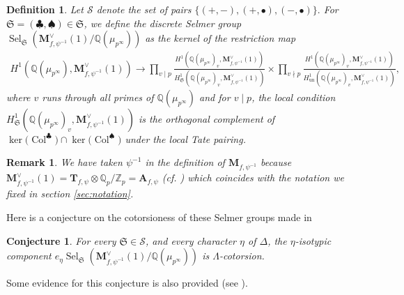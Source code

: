 \documentclass{amsart}
\newcommand{\Q}{\mathbb{Q}}
\newcommand{\Z}{\mathbb{Z}}
\newcommand{\fS}{\mathfrak{S}}
\newcommand{\bT}{\mathbf{T}}
\newcommand{\bA}{\mathbf{A}}
\newcommand{\bM}{\mathbf{M}}
\newcommand{\col}{\operatorname{Col}}
\newcommand{\Sel}{\operatorname{Sel}}
\newtheorem{auxiliary proposition}[theorem]{Auxiliary Proposition}
\newtheorem{conjecture}[theorem]{Conjecture}
\newtheorem{definition}[theorem]{Definition}
\newtheorem{main conjecture}[theorem]{Main Conjecture}
\newtheorem{main theorem}[theorem]{Main Theorem}
\newtheorem{modesty proposition}[theorem]{Modesty Proposition}
\newtheorem{open problem}[theorem]{Open Problem}
\newtheorem{remark}[theorem]{Remark}
\newtheorem{convergence lemma}[theorem]{Convergence Lemma}
\newtheorem{corrected lemma}[theorem]{Corrected Lemma}
\newtheorem{growth lemma}[theorem]{Growth Lemma}
\newtheorem{coefficient lemma}[theorem]{Integrality Lemma}
\newtheorem{interpolation lemma}[theorem]{Interpolation Lemma}
\newtheorem{kernel lemma}[theorem]{Kernel Lemma}
\newtheorem{limit lemma}[theorem]{Limit Lemma}
\newtheorem{tandem lemma}[theorem]{Modesty Lemma}
\newtheorem{zero-finding lemma}[theorem]{Zero-Finding Lemma}
\begin{document}
\begin{definition}\label{def}
    Let $\mathcal{S}$ denote the set of pairs $\{(+,-),(+,\bullet), (-,\bullet)\}.$ For $\fS = (\clubsuit, \spadesuit) \in \fS$, we define the discrete Selmer group $\Sel_{\fS}(\bM_{f, \psi^{-1}}^\vee(1)/\Q(\mu_{p^\infty}))$ as the kernel of the restriction map
    \begin{align*}
       H^1(\Q(\mu_{p^\infty}), \bM_{f, \psi^{-1}}^\vee(1))\rightarrow \prod_{v \mid p}\frac{ H^1(\Q(\mu_{p^\infty})_v, \bM_{f, \psi^{-1}}^\vee(1))}{ H^1_{\fS}(\Q(\mu_{p^\infty})_v, \bM_{f, \psi^{-1}}^\vee(1))} \times \prod_{v \nmid p}\frac{H^1(\Q(\mu_{p^\infty})_v, \bM_{f, \psi^{-1}}^\vee(1))}{H^1_{\mathrm{un}}(\Q(\mu_{p^\infty})_v, \bM_{f, \psi^{-1}}^\vee(1))},
    \end{align*}
    where $v$ runs through all primes of $\Q(\mu_{p^\infty})$ and for $v \mid p$, the local condition $H^1_{\fS}(\Q(\mu_{p^\infty})_v, \bM_{f, \psi^{-1}}^\vee(1))$ is the orthogonal complement of $\ker\big(\col^\clubsuit\big) \cap \ker\big(\col^\spadesuit\big)$ under the local Tate pairing.
\end{definition}

\begin{remark}
   We have taken $\psi^{-1}$ in the definition of $\bM_{f, \psi^{-1}}$ because $\bM_{f, \psi^{-1}}^\vee(1)=\bT_{f, \psi} \otimes \Q_p/\Z_p=\bA_{f, \psi}$ (cf. \cite[Notation 3.2.4]{LZ16}) which coincides with the notation we fixed in section \ref{sec:notation}.
\end{remark}
Here is a conjecture on the cotorsioness of these Selmer groups made in \cite[Conjecture 4.4.3]{BLV}
\begin{conjecture}\label{conj:torsion}
For every $\fS \in \mathcal{S}$, and every character $\eta$ of $\Delta$, the $\eta$-isotypic component $e_\eta\Sel_{\fS}(\bM_{f, \psi^{-1}}^\vee(1)/\Q(\mu_{p^\infty}))$ is $\Lambda$-cotorsion.
\end{conjecture}
Some evidence for this conjecture is also provided (see \cite[Theorem B, (ii)]{BLV}).
\end{document}
